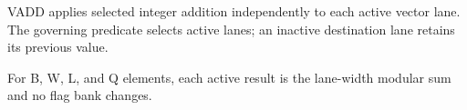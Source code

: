 VADD applies selected integer addition independently to each active vector
lane. The governing predicate selects active lanes; an inactive destination
lane retains its previous value.

For B, W, L, and Q elements, each active result is the lane-width modular sum
and no flag bank changes.

